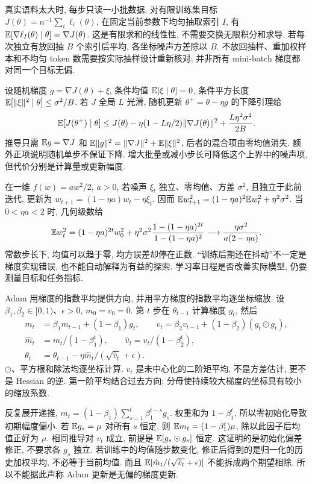 真实语料太大时, 每步只读一小批数据. 对有限训练集目标 $J(\theta)=n^{-1}\sum_i\ell_i(\theta)$, 在固定当前参数下均匀抽取索引 $I$, 有
$\mathbb E[\nabla\ell_I(\theta)\mid\theta]=\nabla J(\theta)$.
这是有限求和的线性性, 不需要交换无限积分和求导. 若每次独立有放回抽 $B$ 个索引后平均, 各坐标噪声方差除以 $B$. 不放回抽样、重加权样本和不均匀 token 数需要按实际抽样设计重新核对; 并非所有 mini-batch 梯度都对同一个目标无偏.

设随机梯度 $g=\nabla J(\theta)+\xi$, 条件均值 $\mathbb E[\xi\mid\theta]=0$, 条件平方长度 $\mathbb E[\lVert \xi\rVert^2\mid\theta]\le\sigma^2/B$. 若 $J$ 全局 $L$ 光滑, 随机更新 $\theta^+=\theta-\eta g$ 的下降引理给
\[
\mathbb E[J(\theta^+)\mid\theta]
\le J(\theta)-\eta(1-L\eta/2)\lVert \nabla J(\theta)\rVert^2
+\frac{L\eta^2\sigma^2}{2B}.
\]
推导只需 $\mathbb E g=\nabla J$ 和 $\mathbb E\lVert g\rVert^2=\lVert \nabla J\rVert^2+\mathbb E\lVert \xi\rVert^2$, 后者的混合项由零均值消失. 额外正项说明随机单步不保证下降. 增大批量或减小步长可降低这个上界中的噪声项, 但代价分别是计算量或更新幅度.

在一维 $f(w)=aw^2/2$, $a>0$, 若噪声 $\xi_t$ 独立、零均值、方差 $\sigma^2$, 且独立于此前迭代, 更新为 $w_{t+1}=(1-\eta a)w_t-\eta\xi_t$. 因而
$\mathbb E w_{t+1}^2=(1-\eta a)^2\mathbb E w_t^2+\eta^2\sigma^2$.
当 $0<\eta a<2$ 时, 几何级数给
\[
\mathbb E w_t^2=(1-\eta a)^{2t}w_0^2+
\eta^2\sigma^2\frac{1-(1-\eta a)^{2t}}{1-(1-\eta a)^2}
\longrightarrow\frac{\eta\sigma^2}{a(2-\eta a)}.
\]
常数步长下, 均值可以趋于零, 均方误差却停在正数. “训练后期还在抖动”不一定是梯度实现错误, 也不能自动解释为有益的探索. 学习率日程是否改善实际模型, 仍要测量目标和任务指标.

Adam 用梯度的指数平均提供方向, 并用平方梯度的指数平均逐坐标缩放\cite{adam}. 设 $\beta_1,\beta_2\in[0,1)$、$\epsilon>0$, $m_0=v_0=0$. 第 $t$ 步在 $\theta_{t-1}$ 计算梯度 $g_t$, 然后
\[\begin{aligned}
m_t&=\beta_1m_{t-1}+(1-\beta_1)g_t,\qquad
v_t=\beta_2v_{t-1}+(1-\beta_2)(g_t\odot g_t),\\
\hat m_t&=m_t/(1-\beta_1^t),\qquad
\hat v_t=v_t/(1-\beta_2^t),\\
\theta_t&=\theta_{t-1}-\eta\hat m_t/(\sqrt{\hat v_t}+\epsilon).
\end{aligned}\]
$\odot$、平方根和除法均逐坐标计算. $v_t$ 是未中心化的二阶矩平均, 不是方差估计, 更不是 Hessian 的逆. 第一阶平均结合过去方向; 分母使持续较大梯度的坐标具有较小的缩放系数.

反复展开递推, $m_t=(1-\beta_1)\sum_{s=1}^t\beta_1^{t-s}g_s$. 权重和为 $1-\beta_1^t$, 所以零初始化导致初期幅度偏小. 若 $\mathbb E g_s=\mu$ 对所有 $s$ 恒定, 则 $\mathbb E m_t=(1-\beta_1^t)\mu$, 除以此因子后均值正好为 $\mu$. 相同推导对 $v_t$ 成立, 前提是 $\mathbb E[g_s\odot g_s]$ 恒定. 这证明的是初始化偏差修正, 不要求各 $g_s$ 独立. 若训练中的均值随步数变化, 修正后得到的是归一化的历史加权平均, 不必等于当前均值. 而且 $\mathbb E[\hat m_t/(\sqrt{\hat v_t}+\epsilon)]$ 不能拆成两个期望相除, 所以不能据此声称 Adam 更新是无偏的梯度更新.

